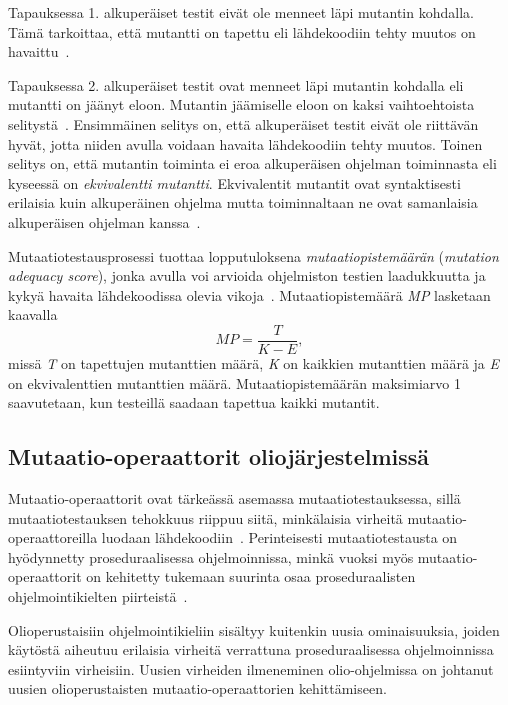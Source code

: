 \documentclass[finnish, grading]{tktltiki2}
\theoremstyle{definition}
\theoremstyle{remark}
\begin{document}
Tapauksessa 1. alkuperäiset testit eivät ole menneet läpi mutantin kohdalla. Tämä tarkoittaa, että mutantti on tapettu eli lähdekoodiin tehty muutos on havaittu~\cite[s. 36]{DeMillo:Lipton:Sayward:1978}.

Tapauksessa 2. alkuperäiset testit ovat menneet läpi mutantin kohdalla eli mutantti on jäänyt eloon. Mutantin jäämiselle eloon on kaksi vaihtoehtoista selitystä~\cite[s. 36]{DeMillo:Lipton:Sayward:1978}. Ensimmäinen selitys on, että alkuperäiset testit eivät ole riittävän hyvät, jotta niiden avulla voidaan havaita lähdekoodiin tehty muutos. Toinen selitys on, että mutantin toiminta ei eroa alkuperäisen ohjelman toiminnasta eli kyseessä on \textit{ekvivalentti mutantti}. Ekvivalentit mutantit ovat syntaktisesti erilaisia kuin alkuperäinen ohjelma mutta toiminnaltaan ne ovat samanlaisia alkuperäisen ohjelman kanssa~\cite[s. 652]{Jia:Harman:2011}.

Mutaatiotestausprosessi tuottaa lopputuloksena \textit{mutaatiopistemäärän} (\textit{mutation adequacy score}), jonka avulla voi arvioida ohjelmiston testien laadukkuutta ja kykyä havaita lähdekoodissa olevia vikoja~\cite[s. 652]{Jia:Harman:2011}. Mutaatiopistemäärä \textit{MP} lasketaan kaavalla 
\begin{equation}
MP = \frac{T}{K - E},
\end{equation}
missä \textit{T} on tapettujen mutanttien määrä, \textit{K} on kaikkien mutanttien määrä ja \textit{E} on ekvivalenttien mutanttien määrä. Mutaatiopistemäärän maksimiarvo 1 saavutetaan, kun testeillä saadaan tapettua kaikki mutantit. 


\subsection{Mutaatio-operaattorit oliojärjestelmissä}

Mutaatio-operaattorit ovat tärkeässä asemassa mutaatiotestauksessa, sillä mutaatiotestauksen tehokkuus riippuu siitä, minkälaisia virheitä mutaatio-operaattoreilla luodaan lähdekoodiin~\cite[s. 352]{Ma:Kwon:Offutt:2002}. Perinteisesti mutaatiotestausta on hyödynnetty proseduraalisessa ohjelmoinnissa, minkä vuoksi myös mutaatio-operaattorit on kehitetty tukemaan suurinta osaa proseduraalisten ohjelmointikielten piirteistä~\cite[s. 352]{Ma:Kwon:Offutt:2002}. 

Olioperustaisiin ohjelmointikieliin sisältyy kuitenkin uusia ominaisuuksia, joiden käytöstä aiheutuu erilaisia virheitä verrattuna proseduraalisessa ohjelmoinnissa esiintyviin virheisiin. Uusien virheiden ilmeneminen olio-ohjelmissa on johtanut uusien olioperustaisten mutaatio-operaattorien kehittämiseen.  
\end{document}
